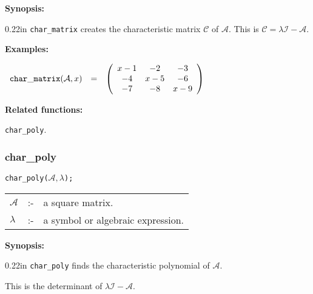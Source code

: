{\bf Synopsis:} %

\begin{addtolength}{\leftskip}{0.22in}
{\tt char\_matrix} creates the characteristic matrix $\mathcal{C}$ of 
$\mathcal{A}$.  This is $\mathcal{C} = \lambda \mathcal{I} - \mathcal{A}$. 

\end{addtolength}

{\bf Examples:}

\begin{flushleft}  
\hspace*{0.1in}
\begin{math}  
\begin{array}{ccc}
{\tt char\_matrix}(\mathcal{A},x) & = & 
\left( \begin{array}{ccc} x-1 & -2 & -3 \\ -4 & x-5 & -6 \\ -7 & -8 & x-9 
\end{array} \right)  
\end{array}  
\end{math}  
\end{flushleft}

{\bf Related functions:}

\hspace*{0.175in} {\tt char\_poly}. 


\subsubsection{char\_poly}
\label{linalg:char_poly}

\hspace*{0.175in} {\tt char\_poly($\mathcal{A},\lambda$);}

\hspace*{0.1in} 
\begin{tabular}{l l l}
$\mathcal{A}$ &:-& a square matrix. \\
$\lambda$ &:-& a symbol or algebraic expression.
\end{tabular}

{\bf Synopsis:} %

\begin{addtolength}{\leftskip}{0.22in}
{\tt char\_poly} finds the characteristic polynomial of
                $\mathcal{A}$.  

This is the determinant of $\lambda \mathcal{I} - \mathcal{A}$.

\end{addtolength}

